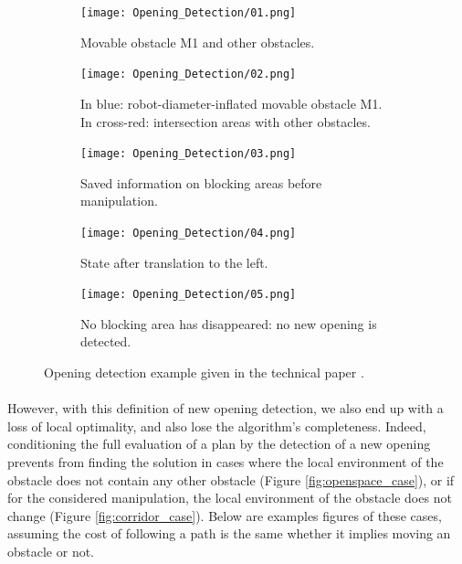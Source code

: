 \begin{figure}[H]

\begin{subfigure}{0.19\textwidth}
\texttt{[image: Opening\_Detection/01.png]}
\caption{Movable obstacle M1 and other obstacles.} \label{fig:opening_detection_01}
\end{subfigure}\hspace*{\fill}
\begin{subfigure}{0.19\textwidth}
\texttt{[image: Opening\_Detection/02.png]}
\caption{In blue: robot-diameter-inflated movable obstacle M1. In cross-red: intersection areas with other obstacles.} \label{fig:opening_detection_02}
\end{subfigure}\hspace*{\fill}
\begin{subfigure}{0.19\textwidth}
\texttt{[image: Opening\_Detection/03.png]}
\caption{Saved information on blocking areas before manipulation.} \label{fig:opening_detection_03}
\end{subfigure}\hspace*{\fill}
\begin{subfigure}{0.19\textwidth}
\texttt{[image: Opening\_Detection/04.png]}
\caption{State after translation to the left.} \label{fig:opening_detection_04}
\end{subfigure}\hspace*{\fill}
\begin{subfigure}{0.19\textwidth}
\texttt{[image: Opening\_Detection/05.png]}
\caption{No blocking area has disappeared: no new opening is detected.} \label{fig:opening_detection_05}
\end{subfigure}

\caption{Opening detection example given in the technical paper \parencite{levihn_efficient_2011}.}
\end{figure}

\paragraph{} However, with this definition of new opening detection, we also end up with a loss of local optimality, and also lose the algorithm's completeness. Indeed, conditioning the full evaluation of a plan by the detection of a new opening prevents from finding the solution in cases where the local environment of the obstacle does not contain any other obstacle (Figure \ref{fig:openspace_case}), or if for the considered manipulation, the local environment of the obstacle does not change (Figure \ref{fig:corridor_case}). Below are examples figures of these cases, assuming the cost of following a path is the same whether it implies moving an obstacle or not.

